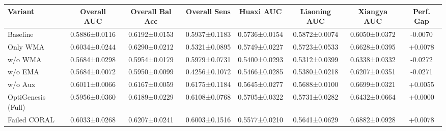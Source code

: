 \begin{tabular}{lccccccc}
\hline
Variant & Overall AUC & Overall Bal Acc & Overall Sens & Huaxi AUC & Liaoning AUC & Xiangya AUC & Perf. Gap \\
\hline
Baseline & 0.5886±0.0116 & 0.6192±0.0153 & 0.5937±0.1183 & 0.5736±0.0154 & 0.5872±0.0074 & 0.6050±0.0372 & -0.0070 \\
Only WMA & 0.6034±0.0244 & 0.6290±0.0212 & 0.5321±0.0895 & 0.5749±0.0227 & 0.5723±0.0533 & 0.6628±0.0395 & +0.0078 \\
w/o WMA & 0.5684±0.0298 & 0.5954±0.0179 & 0.5979±0.0731 & 0.5400±0.0293 & 0.5312±0.0399 & 0.6338±0.0332 & -0.0272 \\
w/o EMA & 0.5684±0.0072 & 0.5950±0.0099 & 0.4256±0.1072 & 0.5466±0.0285 & 0.5380±0.0218 & 0.6207±0.0351 & -0.0271 \\
w/o Aux & 0.6011±0.0066 & 0.6167±0.0059 & 0.6175±0.1184 & 0.5645±0.0277 & 0.5688±0.0100 & 0.6699±0.0321 & +0.0055 \\
OptiGenesis (Full) & 0.5956±0.0360 & 0.6189±0.0229 & 0.6108±0.0768 & 0.5705±0.0322 & 0.5731±0.0282 & 0.6432±0.0664 & +0.0000 \\
Failed CORAL & 0.6033±0.0268 & 0.6207±0.0241 & 0.6003±0.1516 & 0.5577±0.0210 & 0.5641±0.0629 & 0.6882±0.0928 & +0.0078 \\
\hline
\end{tabular}

